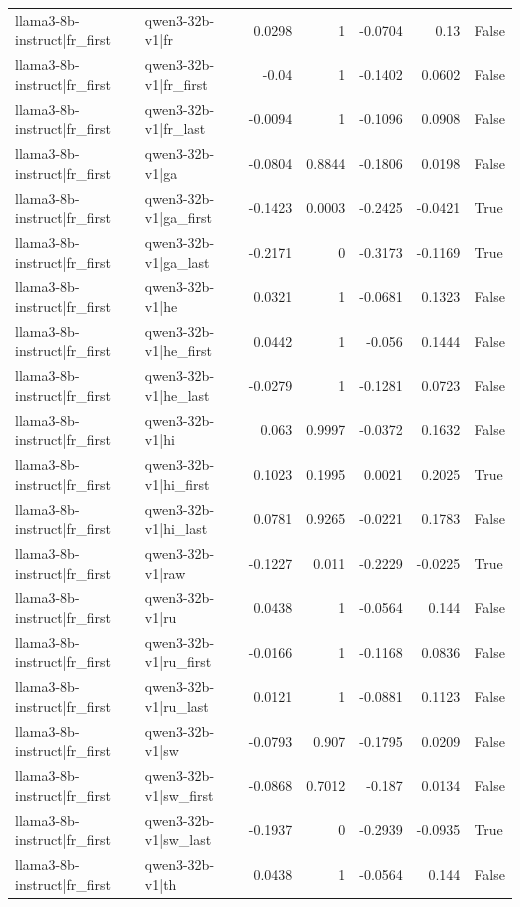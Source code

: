 \begin{table}
\begin{tabular}{l l r r r r l}
llama3-8b-instruct|fr_first & qwen3-32b-v1|fr & 0.0298 & 1 & -0.0704 & 0.13 & False \\
llama3-8b-instruct|fr_first & qwen3-32b-v1|fr_first & -0.04 & 1 & -0.1402 & 0.0602 & False \\
llama3-8b-instruct|fr_first & qwen3-32b-v1|fr_last & -0.0094 & 1 & -0.1096 & 0.0908 & False \\
llama3-8b-instruct|fr_first & qwen3-32b-v1|ga & -0.0804 & 0.8844 & -0.1806 & 0.0198 & False \\
llama3-8b-instruct|fr_first & qwen3-32b-v1|ga_first & -0.1423 & 0.0003 & -0.2425 & -0.0421 & True \\
llama3-8b-instruct|fr_first & qwen3-32b-v1|ga_last & -0.2171 & 0 & -0.3173 & -0.1169 & True \\
llama3-8b-instruct|fr_first & qwen3-32b-v1|he & 0.0321 & 1 & -0.0681 & 0.1323 & False \\
llama3-8b-instruct|fr_first & qwen3-32b-v1|he_first & 0.0442 & 1 & -0.056 & 0.1444 & False \\
llama3-8b-instruct|fr_first & qwen3-32b-v1|he_last & -0.0279 & 1 & -0.1281 & 0.0723 & False \\
llama3-8b-instruct|fr_first & qwen3-32b-v1|hi & 0.063 & 0.9997 & -0.0372 & 0.1632 & False \\
llama3-8b-instruct|fr_first & qwen3-32b-v1|hi_first & 0.1023 & 0.1995 & 0.0021 & 0.2025 & True \\
llama3-8b-instruct|fr_first & qwen3-32b-v1|hi_last & 0.0781 & 0.9265 & -0.0221 & 0.1783 & False \\
llama3-8b-instruct|fr_first & qwen3-32b-v1|raw & -0.1227 & 0.011 & -0.2229 & -0.0225 & True \\
llama3-8b-instruct|fr_first & qwen3-32b-v1|ru & 0.0438 & 1 & -0.0564 & 0.144 & False \\
llama3-8b-instruct|fr_first & qwen3-32b-v1|ru_first & -0.0166 & 1 & -0.1168 & 0.0836 & False \\
llama3-8b-instruct|fr_first & qwen3-32b-v1|ru_last & 0.0121 & 1 & -0.0881 & 0.1123 & False \\
llama3-8b-instruct|fr_first & qwen3-32b-v1|sw & -0.0793 & 0.907 & -0.1795 & 0.0209 & False \\
llama3-8b-instruct|fr_first & qwen3-32b-v1|sw_first & -0.0868 & 0.7012 & -0.187 & 0.0134 & False \\
llama3-8b-instruct|fr_first & qwen3-32b-v1|sw_last & -0.1937 & 0 & -0.2939 & -0.0935 & True \\
llama3-8b-instruct|fr_first & qwen3-32b-v1|th & 0.0438 & 1 & -0.0564 & 0.144 & False \\

\end{tabular}
\end{table}
